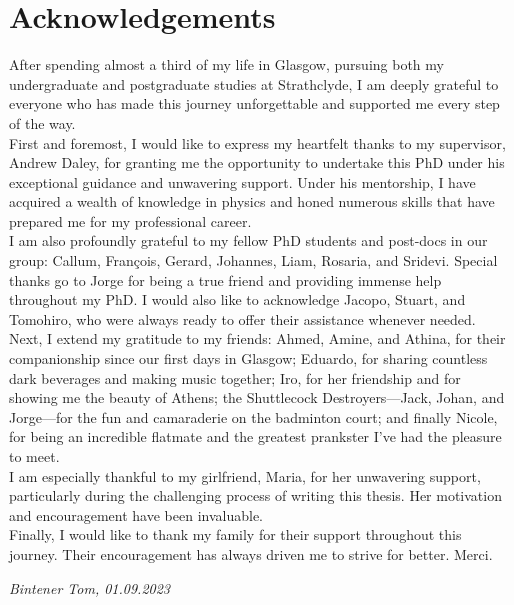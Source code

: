 \chapter*{Acknowledgements}

After spending almost a third of my life in Glasgow, pursuing both my undergraduate and postgraduate studies at Strathclyde, I am deeply grateful to everyone who has made this journey unforgettable and supported me every step of the way. \\

First and foremost, I would like to express my heartfelt thanks to my supervisor, Andrew Daley, for granting me the opportunity to undertake this PhD under his exceptional guidance and unwavering support. Under his mentorship, I have acquired a wealth of knowledge in physics and honed numerous skills that have prepared me for my professional career. \\

I am also profoundly grateful to my fellow PhD students and post-docs in our group: Callum, François, Gerard, Johannes, Liam, Rosaria, and Sridevi. Special thanks go to Jorge for being a true friend and providing immense help throughout my PhD. I would also like to acknowledge Jacopo, Stuart, and Tomohiro, who were always ready to offer their assistance whenever needed. \\

Next, I extend my gratitude to my friends: Ahmed, Amine, and Athina, for their companionship since our first days in Glasgow; Eduardo, for sharing countless dark beverages and making music together; Iro, for her friendship and for showing me the beauty of Athens; the Shuttlecock Destroyers—Jack, Johan, and Jorge—for the fun and camaraderie on the badminton court; and finally Nicole, for being an incredible flatmate and the greatest prankster I've had the pleasure to meet. \\

I am especially thankful to my girlfriend, Maria, for her unwavering support, particularly during the challenging process of writing this thesis. Her motivation and encouragement have been invaluable. \\

Finally, I would like to thank my family for their support throughout this journey. Their encouragement has always driven me to strive for better. Merci.

\vspace{1cm}
\hspace*{\fill} \textit{Bintener Tom, 01.09.2023}

\cleardoublepage
\restoregeometry